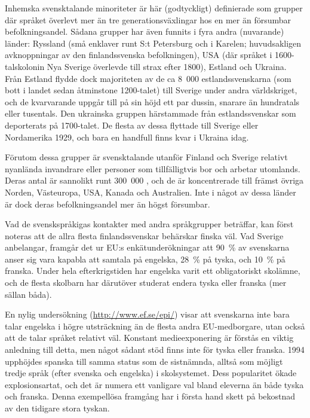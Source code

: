 \begin{multicols}{2}

Inhemska svensktalande minoriteter är här (godtyckligt) definierade
som grupper där språket överlevt mer än tre generationsväxlingar hos
en mer än försumbar befolkningsandel. Sådana grupper har även funnits
i fyra andra (nuvarande) länder: Ryssland (små enklaver runt S:t
Petersburg och i Karelen; huvudsakligen avknoppningar av den
finlandssvenska befolkningen), USA (där språket i 1600-talskolonin Nya
Sverige överlevde till strax efter 1800), Estland och Ukraina. Från
Estland flydde dock majoriteten av de ca 8~000 estlandssvenskarna (som
bott i landet sedan åtminstone 1200-talet) till Sverige under andra
världskriget, och de kvarvarande uppgår till på sin höjd ett par
dussin, snarare än hundratals eller tusentals. Den ukrainska gruppen
härstammade från estlandssvenskar som deporterats på 1700-talet. De
flesta av dessa flyttade till Sverige eller Nordamerika 1929, och bara
en handfull finns kvar i Ukraina idag.

Förutom dessa grupper är svensktalande utanför Finland och Sverige
relativt nyanlända invandrare eller personer som tillfälligtvis bor
och arbetar utomlands. Deras antal är sannolikt runt 300~000
\cite{parkvall2010}, och de är koncentrerade till främst övriga
Norden, Västeuropa, USA, Kanada och Australien. Inte i något av dessa
länder är dock deras befolkningsandel mer än högst försumbar.

Vad de svenskspråkigas kontakter med andra språkgrupper beträffar, kan
först noteras att de allra flesta finlandssvenskar behärskar finska
väl. Vad Sverige anbelangar, framgår det ur EU:s
enkätunderökningar\cite{EC237, EC243} att 90~\% av
svenskarna anser sig vara kapabla att samtala på engelska, 28~\% på
tyska, och 10~\% på franska. Under hela efterkrigstiden har engelska
varit ett obligatoriskt skol\-ämne, och de flesta skolbarn har därutöver
studerat endera tyska eller franska (mer sällan båda). 


En nylig undersökning (\url{http://www.ef.se/epi/}) visar att svenskarna
inte bara talar engelska i högre utsträckning än de flesta andra
EU-medborgare, utan också att de talar språket relativt väl. Konstant
medie\-expo\-nering är förstås en viktig anledning till detta, men något
sådant stöd finns inte för tyska eller franska. 1994 upphöjdes spanska
till samma status som de sistnämnda, alltså som möjligt tredje språk
(efter svenska och engelska) i skolsystemet. Dess popularitet ökade
explosionsartat, och det är numera ett vanligare val bland eleverna än
både tyska och franska. Denna exempellösa framgång har i första hand
skett på bekostnad av den tidigare stora tyskan.


\end{multicols}
